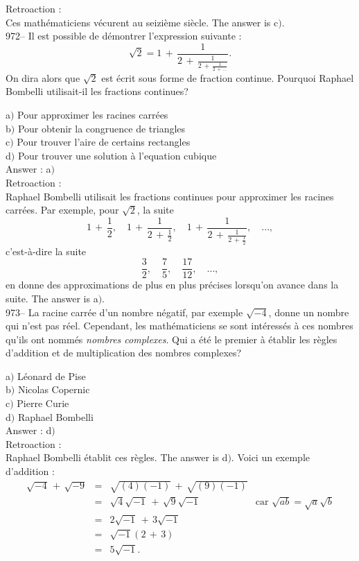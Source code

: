 ﻿\documentclass[letterpaper, 12pt]{article}
\begin{document}
Retroaction : \\
Ces math\'ematiciens v\'ecurent au seizi\`eme si\`ecle. The answer is
c$)$.\\

972-- Il est possible de d\'emontrer l'expression suivante :
$$\sqrt2=1\,+\,\frac1{2\,+\,\frac1{2\,+\,\frac1{2\,+\,\ldots}}}.$$
On dira alors que $\sqrt2$ est \'ecrit sous forme de fraction
continue. Pourquoi Raphael Bombelli utilisait-il les fractions
continues?

a$)$ Pour approximer les racines carr\'ees \\
b$)$ Pour obtenir la congruence de triangles \\
c$)$ Pour trouver l'aire de certains rectangles  \\
d$)$ Pour trouver une solution \`a l'equation cubique \\

Answer : a$)$\\

Retroaction : \\
Raphael Bombelli utilisait les fractions continues pour approximer
les racines carr\'ees. Par exemple, pour $\sqrt2$, la suite
$$1\,+\,\frac12,\quad1\,+\,\frac1{2\,+\,\frac12},\quad1\,+\,\frac1{2\,+\,\frac1{2\,+\,\frac12}},\quad\ldots,$$
c'est-\`a-dire la suite
$$\displaystyle\frac32,\quad\displaystyle\frac75,\quad\displaystyle\frac{17}{12},\quad\ldots,$$
en donne des approximations de plus en plus pr\'ecises lorsqu'on avance dans
la suite. The answer is a$)$.\\

973-- La racine carr\'ee d'un nombre n\'egatif, par exemple
$\sqrt{-4}$, donne un nombre qui n'est pas r\'eel. Cependant, les
math\'ematiciens se sont int\'eress\'es \`a ces nombres qu'ils ont
nomm\'es {\sl nombres complexes}. Qui a \'et\'e le premier \`a
\'etablir les r\`egles d'addition et de multiplication des nombres
complexes?

a$)$ L\'eonard de Pise \\
b$)$ Nicolas Copernic \\
c$)$ Pierre Curie  \\
d$)$ Raphael Bombelli \\

Answer : d$)$\\

Retroaction :\\
Raphael Bombelli \'etablit ces r\`egles. The answer is d$)$.
Voici un exemple d'addition :
$$\begin{array}{rcll}
\sqrt{-4}\,+\,\sqrt{-9} & = & \sqrt{(4)(-1)}\,+\,\sqrt{(9)(-1)}   & \\
[3mm]
                    & = & \sqrt4\sqrt{-1}\,+\,\sqrt9\sqrt{-1} & \text{car }
\sqrt{ab}=\sqrt a\sqrt b \\ [3mm]
                    & = & 2\sqrt{-1}\,+\,3\sqrt{-1}           & \\ [3mm]
                    & = & \sqrt{-1}(2\,+\,3)                  & \\ [3mm]
                    & = & 5\sqrt{-1}.
\end{array}$$
\\
\end{document}
